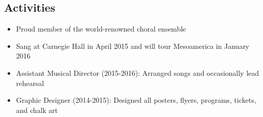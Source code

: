 \documentclass{zres}
\begin{document}
\begin{resume}
\section{Activities}

\begin{itemize}[leftmargin=10pt]
  \item Proud member of the world-renowned choral ensemble
  \item Sang at Carnegie Hall in April 2015 and will tour Mesoamerica in January 2016
\end{itemize}

\begin{itemize}[leftmargin=10pt]
  \item Assistant Musical Director (2015-2016): Arranged songs and occasionally lead rehearsal
  \item Graphic Designer (2014-2015): Designed all posters, flyers, programs, tickets, and chalk art
\end{itemize}

\end{resume}
\end{document}
